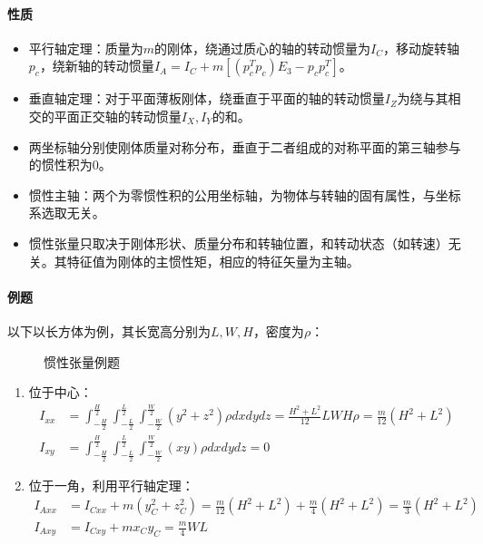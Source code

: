 \documentclass[
12pt, %
a4paper, 
oneside, %
headinclude,footinclude, %
]{scrartcl}
\begin{document}
\paragraph{性质}
\begin{itemize}
\item 平行轴定理：质量为$ m $的刚体，绕通过质心的轴的转动惯量为$ I_C $，移动旋转轴$ p_c $，绕新轴的转动惯量$ I_A = I_C + m[(p_c^Tp_c)E_3 - p_cp_c^T] $。
\item 垂直轴定理：对于平面薄板刚体，绕垂直于平面的轴的转动惯量$ I_Z $为绕与其相交的平面正交轴的转动惯量$ I_X,I_Y $的和。
\item 两坐标轴分别使刚体质量对称分布，垂直于二者组成的对称平面的第三轴参与的惯性积为$ 0 $。
\item 惯性主轴：两个为零惯性积的公用坐标轴，为物体与转轴的固有属性，与坐标系选取无关。
\item 惯性张量只取决于刚体形状、质量分布和转轴位置，和转动状态（如转速）无关。其特征值为刚体的主惯性矩，相应的特征矢量为主轴。
\end{itemize}
\paragraph{例题}
{\footnotesize
以下以长方体为例，其长宽高分别为$ L,W,H $，密度为$ \rho $：

\begin{figure}[H]
\centering
\subfloat[位于中心]{\texttt{[image: 6.1]}} \quad
\subfloat[位于一角]{\texttt{[image: 6.2]}}
\caption[惯性张量例题]{惯性张量例题}
\end{figure}
\begin{enumerate}
\item 位于中心：
\begin{align*}
I_{xx} &= \int_{-\frac{H}{2}}^{\frac{H}{2}} \int_{-\frac{L}{2}}^{\frac{L}{2}} \int_{-\frac{W}{2}}^{\frac{W}{2}} (y^2 + z^2)\rho dxdydz = \frac{H^2 + L^2}{12} LWH\rho = \frac{m}{12}(H^2 + L^2) \\
I_{xy} &= \int_{-\frac{H}{2}}^{\frac{H}{2}} \int_{-\frac{L}{2}}^{\frac{L}{2}} \int_{-\frac{W}{2}}^{\frac{W}{2}} (xy)\rho dxdydz = 0
\end{align*}
\item 位于一角，利用平行轴定理：
\begin{align*}
I_{Axx} &= I_{Cxx} + m(y_C^2 + z_C^2) = \frac{m}{12}(H^2 + L^2) + \frac{m}{4}(H^2 + L^2) = \frac{m}{3}(H^2 + L^2) \\
I_{Axy} &= I_{Cxy} + m x_C y_C = \frac{m}{4}WL
\end{align*}
\end{enumerate}
}
\end{document}
